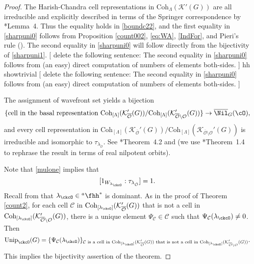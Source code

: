 \documentclass[12pt,a4paper]{amsart}
\newcommand{\trivial}[2][]{\if\relax\detokenize{#1}\relax
  {%
      \color{orange} \vspace{0em} $[$  #2 $]$
      \color{black}
  }
  \else
\ifx#1h
\ifcsname showtrivial\endcsname
{%
    \color{orange} \vspace{0em}  $[$ #2 $]$
    \color{black}
}
\fi
\else {\red Wrong argument!} \fi
\fi
}
\newcommand{\CC}{{\mathcal {C}}}
\newcommand{\CK}{{\mathcal {K}}}
\newcommand{\CO}{{\mathcal {O}}}
\numberwithin{equation}{section}
\theoremstyle{remark}
\def\Unip{\mathrm{Unip}}
\def\Cint#1{\Coh_{[#1]}}
\def\hha{{}^a\fhh}
\def\Coh{\mathrm{Coh}}
\begin{document}
\begin{proof} The Harish-Chandra cell representations in $\Coh_{\Lambda}(\CK'(G))$  are all irreducible and explicitly
  described in terms of the Springer correspondence by \cite{Bo}*{Lemma~4}. Thus the equality holds in \eqref{boundc22}, and the first equality  in \eqref{sharpuni0}
  follows from Proposition \ref{count002}, \eqref{eq:WA},  \eqref{IndFor}, and Pieri's rule (\cite[Corollary 9.2.4]{GW}).
  The second equality in \eqref{sharpuni0} will follow directly from
  the bijectivity of \eqref{sharpuni1}.
  \trivial[h]{
  {delete the following sentence: }
  The second equality in \eqref{sharpuni0}
  follows from (an easy) direct computation of numbers of elements both-sides.
  }

The assignment of wavefront set yields a bijection
 \[
   \{\textrm{cell in the basal representation $\Cint{\Lambda}(\CK_{\overline{\CO}}'(G))/\Cint{\Lambda}(\CK_{\overline{\CO}\setminus \CO}'(G))$}\} \rightarrow \overline \Nil_{G}(\cO),
 \]
and every cell representation in  $\Cint{\Lambda}(\CK_{\overline{\CO}}'(G))/\Cint{\Lambda}(\CK_{\overline{\CO}\setminus \CO}'(G))$ is irreducible and isomorphic to $\tau_{\lambda_{\check \CO}}$. See \cite{BV.W}*{Theorem~4.2} and
  \cite[Theorem 5]{Bo} (we use \cite{SV}*{Theorem~1.4} to rephrase the result in
  terms of real nilpotent orbits).

 Note that \eqref{mulone} implies   that
 \[
 [1_{W_{\lambda_{\ckcO}}} : \tau_{\lambda_{\check \CO}}]=1.
 \]
 Recall from  that $\lambda_{\ckcO}\in \hha^*$ is dominant. As in the proof of Theorem \ref{count2},  for each cell $\CC$ in $\Cint{\lambda_\ckcO}(\CK_{\overline{\CO}}'(G))$ that is not a cell in $\Cint{\lambda_\ckcO}(\CK_{\overline{\CO}\setminus \CO}'(G))$, there is a unique element $\Psi_\CC\in \CC$ such that $ \Psi_\CC(\lambda_{\ckcO})\neq 0$.
 Then
 \[
    \Unip_{\ckcO}(G) =\{ \Psi_\CC(\lambda_{\ckcO})\}_{\CC\textrm{ is a cell  in $\Cint{\lambda_\ckcO}(\CK_{\overline{\CO}}'(G))$ that is not a cell in $\Cint{\lambda_\ckcO}(\CK_{\overline{\CO}\setminus \CO}'(G))$}}.
 \]
 This implies the bijectivity assertion of the theorem.   %
\end{proof}
\end{document}
